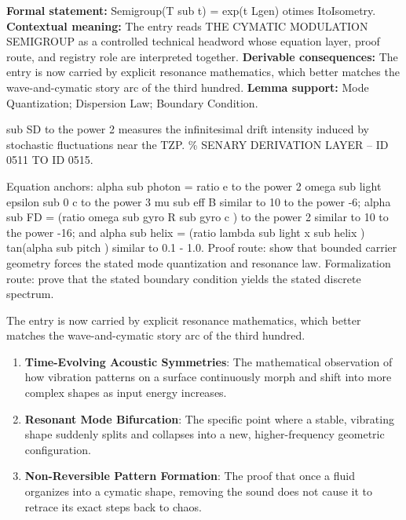 \begingroup\footnotesize\setlength{\emergencystretch}{3em}\sloppy
\textbf{Formal statement:} Semigroup(T sub t) = exp(t Lgen) otimes ItoIsometry. \textbf{Contextual meaning:} The entry reads THE CYMATIC MODULATION SEMIGROUP as a controlled technical headword whose equation layer, proof route, and registry role are interpreted together. \textbf{Derivable consequences:} The entry is now carried by explicit resonance mathematics, which better matches the wave-and-cymatic story arc of the third hundred. \textbf{Lemma support:} Mode Quantization; Dispersion Law; Boundary Condition.\par
\endgroup

sub SD to the power 2 measures the infinitesimal drift intensity induced by stochastic fluctuations near the TZP. \% SENARY DERIVATION LAYER -- ID 0511 TO ID 0515.

Equation anchors: alpha sub photon = ratio e to the power 2 omega sub light epsilon sub 0 c to the power 3 mu sub eff B similar to 10 to the power -6; alpha sub FD = (ratio omega sub gyro R sub gyro c ) to the power 2 similar to 10 to the power -16; and alpha sub helix = (ratio lambda sub light x sub helix ) tan(alpha sub pitch ) similar to 0.1 - 1.0. Proof route: show that bounded carrier geometry forces the stated mode quantization and resonance law. Formalization route: prove that the stated boundary condition yields the stated discrete spectrum.

The entry is now carried by explicit resonance mathematics, which better matches the wave-and-cymatic story arc of the third hundred.
\endgroup

\begin{enumerate}[leftmargin=1.6em,itemsep=6pt,topsep=4pt]
\item \textbf{Time-Evolving Acoustic Symmetries}: The mathematical observation of how vibration patterns on a surface continuously morph and shift into more complex shapes as input energy increases.
\item \textbf{Resonant Mode Bifurcation}: The specific point where a stable, vibrating shape suddenly splits and collapses into a new, higher-frequency geometric configuration.
\item \textbf{Non-Reversible Pattern Formation}: The proof that once a fluid organizes into a cymatic shape, removing the sound does not cause it to retrace its exact steps back to chaos.
\end{enumerate}

